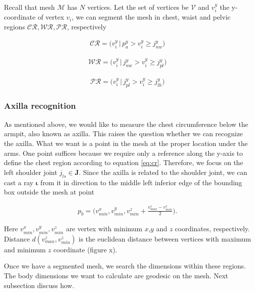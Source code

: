 \documentclass[runningheads, orivec]{llncs}
\begin{document}
Recall that mesh $\mathcal{M}$ has $N$ vertices. Let the set of vertices be 
$\mathcal{V}$ and $v^y_i$ the y-coordinate of vertex $v_i$, we can 
segment the 
mesh in chest, waist and pelvic regions 
$\mathcal{CR}, \mathcal{WR}, \mathcal{PR}$, respectively

\begin{align}\label{eq:cr}
\mathcal{CR} = \big(v^y_i \, | \, p^y_a > v^y_i \geq j^y_{nw} \big)
\end{align}

\begin{align}\label{eq:wr}
\mathcal{WR} = \big(v^y_i \, | \, j^y_{nw} > v^y_i \geq j^y_{pl}\big)
\end{align}

\begin{align}\label{eq:pr}
\mathcal{PR} = \big(v^y_i \, | \, j^y_{pl} > v^y_i \geq j^y_{lh}\big)
\end{align}

\subsubsection{Axilla recognition}\label{subsec:armpit_recog}
As mentioned above, we would like to measure the chest circumference below the 
armpit, also known as axilla. This raises the question whether we can recognize 
the axilla. What we want is a point in the mesh at the proper location under 
the arms. One point suffices because we require only a reference along the 
y-axis to define the chest region according to equation \ref{eq:cr}. Therefore, 
we focus on the left shoulder joint $j_{ls} \in \mathbf{J}$. Since the axilla 
is related to 
the shoulder joint, we can cast a ray $\boldsymbol{\iota}$ from it in direction 
to the middle left 
inferior edge of the bounding box outside the mesh at point

\begin{align}
p_b = \bigg(v^x_{min}, v^y_{min}, v^z_{min} + 
\frac{v^z_{max} - v^z_{min}}{2}\bigg).
\end{align}

Here $v^x_{min}, v^y_{min}, v^z_{min}$ are vertex with minimum $x$,$y$ and $z$ 
coordinates, respectively. Distance $d(v^z_{max},v^z_{min})$ is the euclidean 
distance between vertices with maximum and minimum $z$ coordinate (figure x).

Once we have a segmented mesh, we search the dimensions within 
these regions. The body dimensions we want to calculate are 
geodesic on the mesh. Next subsection discuss how.
\end{document}
